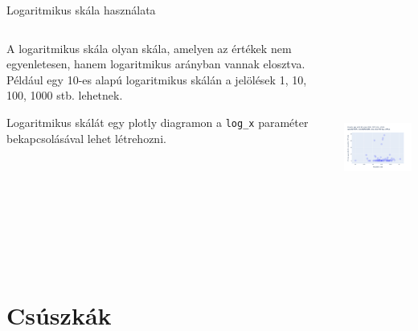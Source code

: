 \documentclass[english, aspectratio=169]{beamer}
\makeatletter
\let\origtableofcontents=\tableofcontents
\def\tableofcontents{\@ifnextchar[{\origtableofcontents}{\gobbletableofcontents}}
\def\gobbletableofcontents#1{\origtableofcontents}
\makeatother
\begin{document}
\begin{frame}{Logaritmikus skála használata}
	\begin{columns}
		\begin{column}{.5\textwidth}
			A logaritmikus skála olyan skála, amelyen az értékek nem egyenletesen, hanem logaritmikus arányban vannak elosztva. Például egy 10-es alapú logaritmikus skálán a jelölések 1, 10, 100, 1000 stb. lehetnek.\par\medskip
			Logaritmikus skálát egy plotly diagramon a \texttt{log\_x} paraméter bekapcsolásával lehet létrehozni. 
		\end{column}
		\begin{column}{.5\textwidth}
			\begin{center}
				\includegraphics[width=7cm, height=7cm, keepaspectratio]{images/scatter_15.png}
			\end{center}
			\end{column}
	\end{columns}
\end{frame}

\section{Csúszkák}

\begin{frame}{}
	\tableofcontents[currentsection]
\end{frame}
\end{document}
